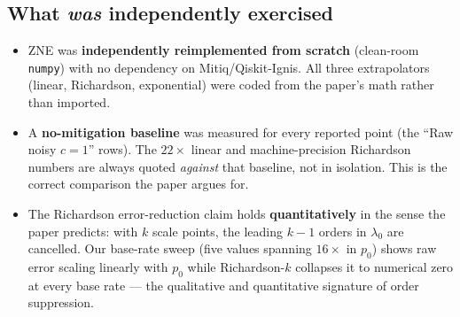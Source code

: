 \documentclass[11pt]{article}
\begin{document}
\subsection*{What \emph{was} independently exercised}
\begin{itemize}
  \item ZNE was \textbf{independently reimplemented from scratch} (clean-room
        \texttt{numpy}) with no dependency on Mitiq/Qiskit-Ignis. All three
        extrapolators (linear, Richardson, exponential) were coded from the
        paper's math rather than imported.
  \item A \textbf{no-mitigation baseline} was measured for every reported
        point (the ``Raw noisy $c{=}1$'' rows). The $22\times$ linear and
        machine-precision Richardson numbers are always quoted \emph{against}
        that baseline, not in isolation. This is the correct comparison the
        paper argues for.
  \item The Richardson error-reduction claim holds \textbf{quantitatively}
        in the sense the paper predicts: with $k$ scale points, the leading
        $k{-}1$ orders in $\lambda_0$ are cancelled. Our base-rate sweep
        (five values spanning $16\times$ in $p_0$) shows raw error scaling
        linearly with $p_0$ while Richardson-$k$ collapses it to numerical
        zero at every base rate --- the qualitative and quantitative
        signature of order suppression.
\end{itemize}
\end{document}
